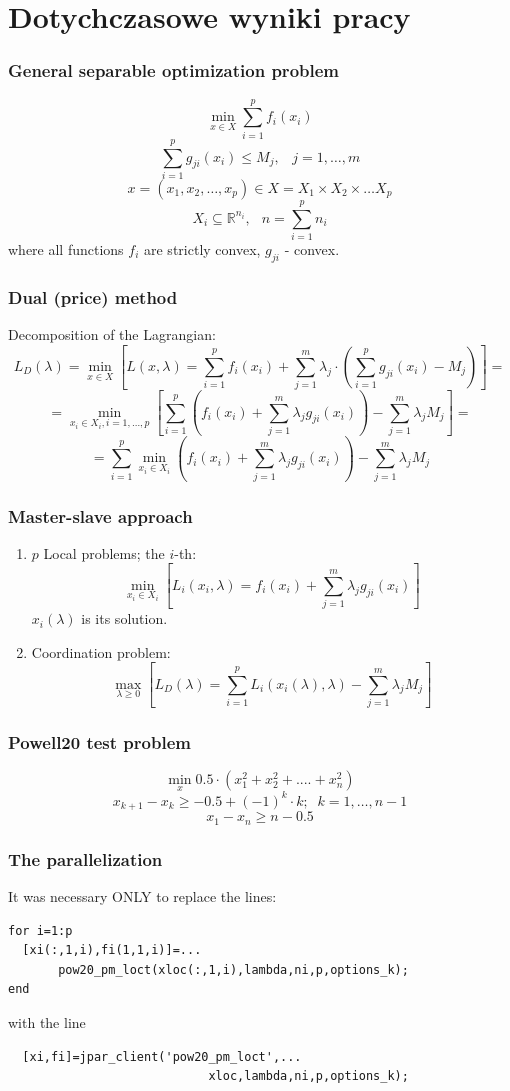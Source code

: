 \documentclass{beamer}
\def\Rset{\mathbb{R}}
\newcommand{\beq}{\begin{equation}}
\newcommand{\eeq}{\end{equation}}
\begin{document}
\section{Dotychczasowe wyniki pracy}

\begin{frame}
\frametitle{General separable optimization problem}
\beq
\min_{x \in X} \sum_{i=1}^p f_i(x_i)
\label{zad.sep.wj}
\eeq
\beq
\sum_{i=1}^p g_{ji}(x_i) \leq M_j, \;\;\;  j=1,\ldots,m
\eeq
\beq
x =(x_1,x_2,\ldots,x_p) \in
X=X_1 \times X_2 \times \ldots X_p
\eeq
\beq X_i \subseteq \Rset^{n_i},\;\;\, n=\sum_{i=1}^p n_i
\label{zad.sep.kon}
\eeq
where all  functions $f_i$ are strictly convex, $g_{ji}$ - convex.
\end{frame}

\begin{frame}
\frametitle{Dual (price) method}
Decomposition of the Lagrangian:
\[
L_D(\lambda) = \min_{x \in X} \left[ L(x,\lambda) =
\sum_{i=1}^p f_i(x_i) + \sum_{j=1}^m \lambda_j \cdot \left( \sum_{i=1}^p g_{ji}(x_i) -
M_j \right) \right]
 =
\]
\[
= \min_{x_i \in
X_i , i=1,\ldots,p} \left[ \sum_{i=1}^p \left(f_i(x_i) +
\sum_{j=1}^m \lambda_j  g_{ji}(x_i) \right) - \sum_{j=1}^m \lambda_j
M_j \right] =
\]
\beq
=\sum_{i=1}^p \min_{x_i \in X_i} \left( f_i(x_i) +
\sum_{j=1}^m \lambda_j  g_{ji}(x_i) \right) - \sum_{j=1}^m \lambda_j
M_j
\label{f.dualna}
\eeq
\end{frame}

\begin{frame}
\frametitle{Master-slave approach}
\begin{enumerate}
\item $p$ Local problems; the $i$-th:
\beq
\min_{x_i \in X_i} \left[ L_i(x_i,\lambda)=f_i(x_i) + \sum_{j=1}^m \lambda_j  g_{ji}(x_i)\right]
\eeq
\hspace{1cm}$x_i(\lambda)$  is its solution.
\item Coordination problem:
\beq
\max_{\lambda \geq 0} \left[ L_D(\lambda)= \sum_{i=1}^p L_i(x_i(\lambda),\lambda)
           - \sum_{j=1}^m   \lambda_j M_j \right]
\eeq
\end{enumerate}
\end{frame}

\begin{frame}
\frametitle{Powell20 test problem}
\beq
    \min_{x} 0.5 \cdot ( x_1^2+x_2^2+....+x_n^2 )
\eeq
\beq
                 x_{k+1}-x_{k} \geq -0.5+(-1)^k\cdot k; \;\; k=1,\ldots,n-1
\eeq
\beq
                  x_1-x_n \geq n-0.5
\eeq
\end{frame}
\begin{frame}[fragile]
\frametitle{The parallelization}
It was necessary ONLY to replace the lines:
\begin{verbatim}
for i=1:p
  [xi(:,1,i),fi(1,1,i)]=...
       pow20_pm_loct(xloc(:,1,i),lambda,ni,p,options_k);
end
\end{verbatim}
with the line
\begin{verbatim}
  [xi,fi]=jpar_client('pow20_pm_loct',...
                            xloc,lambda,ni,p,options_k);
\end{verbatim}
\end{frame}
\end{document}
